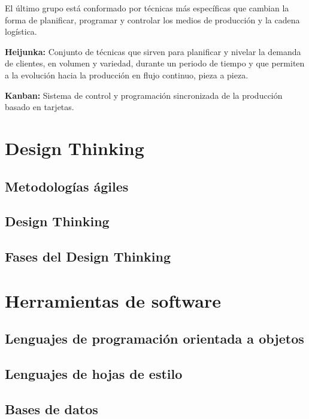 El último grupo está conformado por técnicas más específicas que cambian la forma de planificar, programar  y controlar los medios de producción y la cadena logística. 

\begin{description}
\item \textbf{Heijunka:} Conjunto de técnicas que sirven para planificar y nivelar la demanda de clientes, en volumen y variedad, durante un periodo de tiempo y que permiten a la evolución hacia la producción en flujo continuo, pieza a pieza.

\item \textbf{Kanban:} Sistema de control y programación sincronizada de la producción basado en tarjetas.
\end{description}


\section{Design Thinking}

\subsection{Metodologías ágiles}

\subsection{Design Thinking}

\subsection{Fases del Design Thinking}


\section{Herramientas de software}

\subsection{Lenguajes de programación orientada a objetos}

\subsection{Lenguajes de hojas de estilo}

\subsection{Bases de datos}

